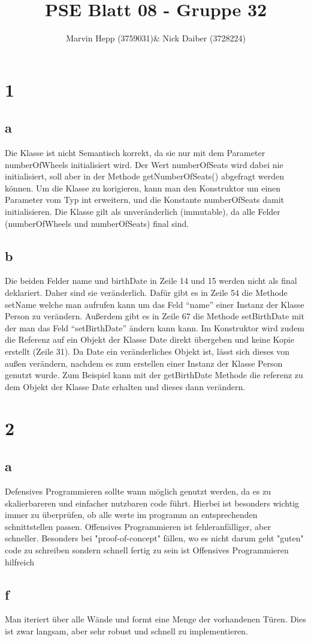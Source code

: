 \documentclass{article}
\title{PSE Blatt 08 - Gruppe 32}
\author{Marvin Hepp (3759031)\& Nick Daiber (3728224)}
\begin{document}
\maketitle
\section*{1}
\subsection*{a}
Die Klasse ist nicht Semantisch korrekt, da sie nur mit dem Parameter numberOfWheels
initialisiert wird. Der Wert numberOfSeats wird dabei nie initialisiert, soll aber in der Methode
getNumberOfSeats() abgefragt werden können. Um die Klasse zu korigieren, kann man den
Konstruktor um einen Parameter vom Typ int erweitern, und die Konstante numberOfSeats
damit initialisieren.
Die Klasse gilt als unveränderlich (immutable), da alle Felder (numberOfWheels und
numberOfSeats) final sind.
\subsection*{b}
Die beiden Felder name und birthDate in Zeile 14 und 15 werden nicht als final deklariert.
Daher sind sie veränderlich. Dafür gibt es in Zeile 54 die Methode setName welche man
aufrufen kann um das Feld “name” einer Instanz der Klasse Person zu verändern. Außerdem
gibt es in Zeile 67 die Methode setBirthDate mit der man das Feld “setBirthDate” ändern kann
kann.
Im Konstruktor wird zudem die Referenz auf ein Objekt der Klasse Date direkt übergeben und
keine Kopie erstellt (Zeile 31). Da Date ein veränderliches Objekt ist, lässt sich dieses von
außen verändern, nachdem es zum erstellen einer Instanz der Klasse Person genutzt wurde.
Zum Beispiel kann mit der getBirthDate Methode die referenz zu dem Objekt der Klasse Date
erhalten und dieses dann verändern.
\section*{2}
\subsection*{a}
Defensives Programmieren sollte wann möglich genutzt werden, da es zu
skalierbareren und einfacher nutzbaren code führt. Hierbei ist besonders
wichtig immer zu überprüfen, ob alle werte im programm an entsprechenden
schnittstellen passen.
Offensives Programmieren ist fehleranfälliger, aber schneller.
Besonders bei "proof-of-concept" fällen, wo es nicht darum geht
"guten" code zu schreiben sondern schnell fertig zu sein ist Offensives
Programmieren hilfreich
\subsection*{f}
Man iteriert über alle Wände und formt eine Menge der vorhandenen Türen.
Dies ist zwar langsam, aber sehr robust und schnell zu implementieren.
\end{document}
